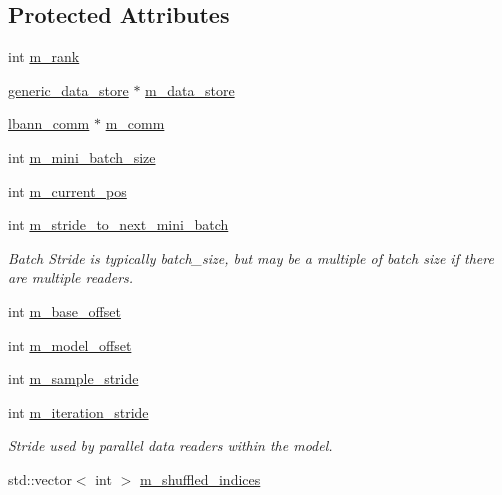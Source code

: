 \subsection*{Protected Attributes}
\begin{DoxyCompactItemize}
\item 
int \hyperlink{classlbann_1_1generic__data__reader_a1a7fec32155bf863d7f75bd1401532bb}{m\+\_\+rank}
\item 
\hyperlink{classlbann_1_1generic__data__store}{generic\+\_\+data\+\_\+store} $\ast$ \hyperlink{classlbann_1_1generic__data__reader_aefc076b842933a882214f4f709ca49c9}{m\+\_\+data\+\_\+store}
\item 
\hyperlink{classlbann_1_1lbann__comm}{lbann\+\_\+comm} $\ast$ \hyperlink{classlbann_1_1generic__data__reader_ad3976d4b7db2d404dbb87a56c33fd456}{m\+\_\+comm}
\item 
int \hyperlink{classlbann_1_1generic__data__reader_a96f87a7d09711ab3eee3940ff2aa36ec}{m\+\_\+mini\+\_\+batch\+\_\+size}
\item 
int \hyperlink{classlbann_1_1generic__data__reader_a2facf4e410099ac8c1fa586e797ec2e0}{m\+\_\+current\+\_\+pos}
\item 
int \hyperlink{classlbann_1_1generic__data__reader_a02c4632cc7cad5c3e4062934c41717a0}{m\+\_\+stride\+\_\+to\+\_\+next\+\_\+mini\+\_\+batch}
\begin{DoxyCompactList}\small\item\em Batch Stride is typically batch\+\_\+size, but may be a multiple of batch size if there are multiple readers. \end{DoxyCompactList}\item 
int \hyperlink{classlbann_1_1generic__data__reader_a77946c4dca753c23f39e9a490eba1229}{m\+\_\+base\+\_\+offset}
\item 
int \hyperlink{classlbann_1_1generic__data__reader_a5d9a0efd1ebe43a74911c35ffe84edc9}{m\+\_\+model\+\_\+offset}
\item 
int \hyperlink{classlbann_1_1generic__data__reader_a58461c39de7e17eafc5b98aec99cbb9b}{m\+\_\+sample\+\_\+stride}
\item 
int \hyperlink{classlbann_1_1generic__data__reader_a73b23a2e7768db4e9e8ba4d9a362163a}{m\+\_\+iteration\+\_\+stride}
\begin{DoxyCompactList}\small\item\em Stride used by parallel data readers within the model. \end{DoxyCompactList}\item 
std\+::vector$<$ int $>$ \hyperlink{classlbann_1_1generic__data__reader_aaab6aeff67ffff1c689336851fec2c57}{m\+\_\+shuffled\+\_\+indices}

\end{DoxyCompactItemize}
